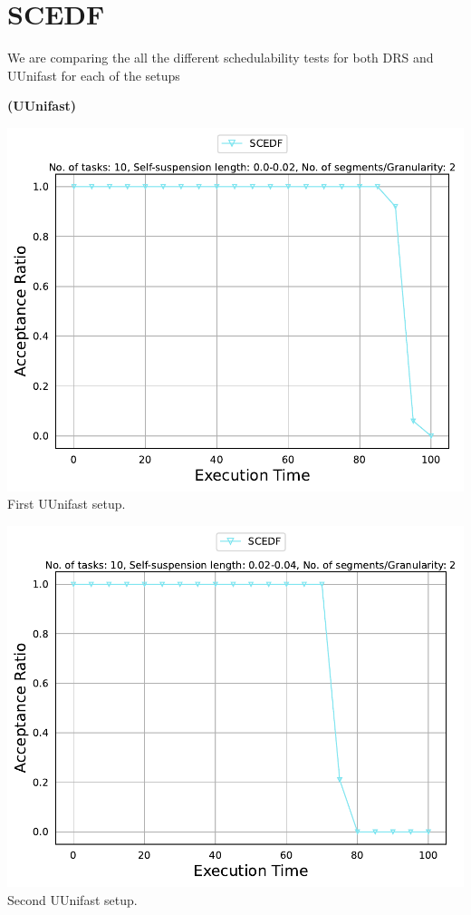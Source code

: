 \documentclass[]{article}
\begin{document}
        \section{SCEDF}
{
\raggedleft We are comparing the all the different schedulability tests for both DRS and UUnifast for each of the setups \newline
}

	\begin{minipage}[t]{0.48\linewidth}
		\centering
		\textbf{(UUnifast)}
		\vspace{0.3cm}
		
		\includegraphics[width=\linewidth]{SCEDF[2][0.0-0.02][10].pdf}
		First UUnifast setup.
		\vspace{0.3cm}
		
		\includegraphics[width=\linewidth]{SCEDF[2][0.02-0.04][10].pdf}
		Second UUnifast setup.
		\vspace{0.3cm}
		

\end{minipage}
\end{document}
